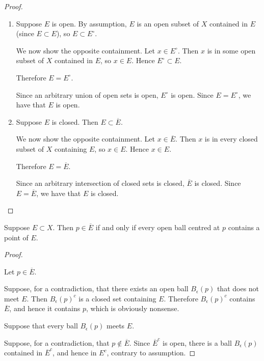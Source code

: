 \begin{proof} \
\begin{enumerate}[label=(\roman*)]
\item \forward Suppose $E$ is open. By assumption, $E$ is an open subset of $X$ contained in $E$ (since $E\subset E$), so $E\subset E^\circ$. 

We now show the opposite containment. Let $x\in E^\circ$. Then $x$ is in some open subset of $X$ contained in $E$, so $x\in E$. Hence $E^\circ\subset E$. 

Therefore $E=E^\circ$.

\backward Since an arbitrary union of open sets is open, $E^\circ$ is open. Since $E=E^\circ$, we have that $E$ is open.

\item \forward Suppose $E$ is closed. Then $E\subset\overline{E}$. 

We now show the opposite containment. Let $x\in\overline{E}$. Then $x$ is in every closed subset of $X$ containing $E$, so $x\in E$. Hence $x\in E$.

Therefore $E=\overline{E}$.

\backward Since an arbitrary intersection of closed sets is closed, $\overline{E}$ is closed. Since $E=\overline{E}$, we have that $E$ is closed.
\end{enumerate}
\end{proof}

\begin{proposition}
Suppose $E\subset X$. Then $p\in\overline{E}$ if and only if every open ball centred at $p$ contains a point of $E$.
\end{proposition}

\begin{proof} \

\forward Let $p\in\overline{E}$. 

Suppose, for a contradiction, that there exists an open ball $B_\epsilon(p)$ that does not meet $E$. Then $B_\epsilon(p)^c$ is a closed set containing $E$. Therefore $B_\epsilon(p)^c$ contains $\overline{E}$, and hence it contains $p$, which is obviously nonsense.

\backward Suppose that every ball $B_\epsilon(p)$ meets $E$. 

Suppose, for a contradiction, that $p\notin\overline{E}$. 
Since $\overline{E}^c$ is open, there is a ball $B_\epsilon(p)$ contained in $\overline{E}^c$, and hence in $E^c$, contrary to assumption.
\end{proof}

